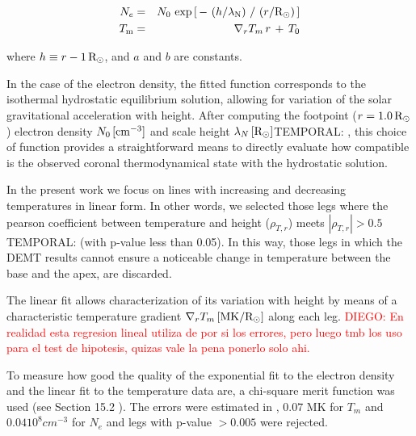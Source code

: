\documentclass[namedreferences]{solarphysics}
\renewcommand{\l}{\lambda_{\rm N}}%
\newcommand{\mrsun}{{\rm R_\odot}}
\newcommand{\MK}{{\rm MK}}
\newcommand{\cm}{{\rm cm}}
\newcommand{\lN}{\lambda_N}
\def\diego#1{\textcolor{red}{DIEGO: #1}}
\def\temp#1{\textcolor{mygray}{TEMPORAL: #1}}
\begin{document}
\begin{article}
\begin{eqnarray}\label{Nfit}
N_e &=& N_0\,\exp{\left[\,-\,\left(h/\l\right)\,/\,\left(r/\mrsun\right)\,\right]}\\
\label{Tfit}
T_\textrm{m} &=&  \nabla_r T_m \,r\,+\,T_\textrm{0}
\end{eqnarray}
 
\noindent
where $h \equiv r - 1\,\mrsun$, and $a$ and $b$ are constants. 

In the case of the electron density, the fitted function corresponds to the isothermal hydrostatic equilibrium solution, allowing for variation of the solar gravitational acceleration with height. After computing the footpoint ($r=1.0\,\mrsun$) electron density $N_{0}\,[\cm^{-3}]$ and scale height $\lN\,[\mrsun]$\temp{, this choice of function provides a straightforward means to directly evaluate how compatible is the observed coronal thermodynamical state with the hydrostatic solution}.



In the present work we focus on lines with increasing and decreasing temperatures in linear form. In other words, we selected those legs where the pearson coefficient between temperature and height ($\rho_{T,r}$) meets $|\rho_{T,r}| > 0.5$ \temp{(with p-value less than 0.05)}. In this way, those legs in which the DEMT results cannot ensure a noticeable change in temperature between the base and the apex, are discarded.


The linear fit allows characterization of its variation with height by means of a characteristic temperature gradient $\nabla_r T_m\,[\MK/\mrsun]$ along each leg.
\diego{En realidad esta regresion lineal utiliza de por si los errores, pero luego tmb los uso para el test de hipotesis, quizas vale la pena ponerlo solo ahi.}


To measure how good the quality of the exponential fit to the electron density and the linear fit to the temperature data are, a chi-square merit function was used (see Section 15.2 \citet{recipes}). The errors were estimated in \citet{lloveras_2017}, $0.07$ MK for $T_m$ and $0.04 10^8 cm^{-3}$ for $N_e$ and legs with p-value $>0.005$ were rejected. 



\end{article}
\end{document}
